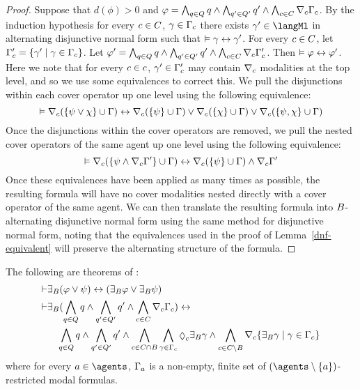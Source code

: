 \begin{proof}
Suppose that $d(\phi) > 0$ and $\varphi = \bigwedge_{q \in Q} q \land \bigwedge_{q' \in Q'} q' \land \bigwedge_{c \in C} \nabla_{c} \Gamma_c$.
By the induction hypothesis for every $c \in C$, $\gamma \in \Gamma_c$ there exists $\gamma' \in \langMl$ in alternating disjunctive normal form such that $\vDash \gamma \leftrightarrow \gamma'$.
For every $c \in C$, let $\Gamma'_c = \{\gamma' \mid \gamma \in \Gamma_c\}$.
Let $\varphi' = \bigwedge_{q \in Q} q \land \bigwedge_{q' \in Q'} q' \land \bigwedge_{c \in C} \nabla_{c} \Gamma'_c$.
Then $\vDash \varphi \leftrightarrow \varphi'$.
Here we note that for every $c \in c$, $\gamma' \in \Gamma'_c$ may contain $\nabla_{c}$ modalities at the top level, and so we use some equivalences to correct this.
We pull the disjunctions within each cover operator up one level using the following equivalence:
$$
\vDash \nabla_{c} (\{\psi \lor \chi\} \cup \Gamma) \leftrightarrow \nabla_{c} (\{\psi\} \cup \Gamma) \lor \nabla_{c} (\{\chi\} \cup \Gamma) \lor \nabla_{c} (\{\psi, \chi\} \cup \Gamma)
$$
Once the disjunctions within the cover operators are removed, we pull the nested cover operators of the same agent up one level using the following equivalence:
$$
\vDash \nabla_{c} (\{\psi \land \nabla_{c} \Gamma'\} \cup \Gamma) \leftrightarrow \nabla_{c} (\{\psi\} \cup \Gamma) \land \nabla_{c} \Gamma'
$$
Once these equivalences have been applied as many times as possible, the resulting formula will have no cover modalities nested directly with a cover operator of the same agent.
We can then translate the resulting formula into $B$-alternating disjunctive normal form using the same method for disjunctive normal form, noting that the equivalences used in the proof of Lemma~\ref{dnf-equivalent} will preserve the alternating structure of the formula.
\end{proof}

\begin{lemma}\label{rml-kd-theorems}
The following are theorems of \axiomRmlKD{}:
\begin{align}
    \proves & \somerefsBs (\phi \lor \psi) \iff (\somerefsBs \phi \lor \somerefsBs \psi) \label{rml-kd-or}\\
    \proves & \displaystyle \somerefsBs (\bigwedge_{\atomQ \in \atomsQ} \atomQ \land \bigwedge_{\atomQ' \in \atomsQ'} \atomQ' \land \bigwedge_{\agentC \in \agentsC} \coverC \Gamma_\agentC) \iff \nonumber\\
            & \displaystyle \quad
            \bigwedge_{\atomQ \in \atomsQ} \atomQ \land \bigwedge_{\atomQ' \in \atomsQ'} \atomQ' \land 
            \bigwedge_{\agentC \in \agentsC \cap \agentsB} \bigwedge_{\gamma \in \Gamma_\agentC} \possibleC \somerefsBs \gamma \land
            \bigwedge_{\agentC \in \agentsC \setminus \agentsB} \coversC \{\somerefsBs \gamma \mid \gamma \in \Gamma_\agentC\} \label{rml-kd-cover}
\end{align}
where for every $\agentA \in \agents$, $\Gamma_a$ is a non-empty, finite set of $(\agents \setminus \{\agentA\})$-restricted modal formulas.
\end{lemma}

